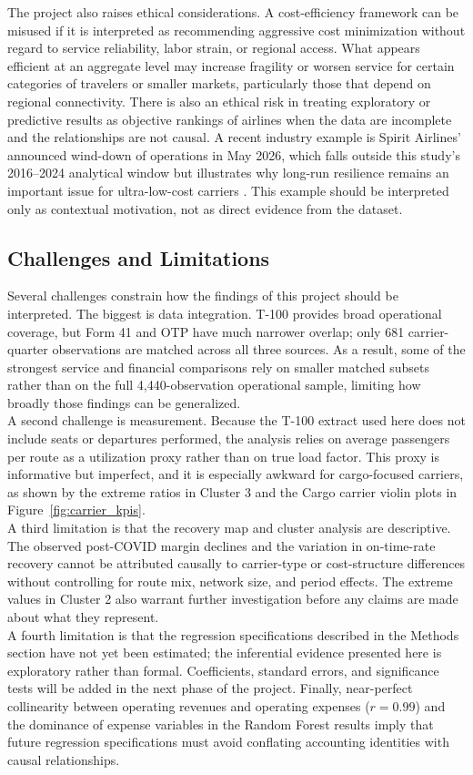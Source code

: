 \documentclass[11pt, letterpaper]{article}
\begin{document}
\indent The project also raises ethical considerations. A cost-efficiency framework can be misused if it is interpreted as recommending aggressive cost minimization without regard to service reliability, labor strain, or regional access. What appears efficient at an aggregate level may increase fragility or worsen service for certain categories of travelers or smaller markets, particularly those that depend on regional connectivity. There is also an ethical risk in treating exploratory or predictive results as objective rankings of airlines when the data are incomplete and the relationships are not causal. A recent industry example is Spirit Airlines' announced wind-down of operations in May 2026, which falls outside this study's 2016--2024 analytical window but illustrates why long-run resilience remains an important issue for ultra-low-cost carriers \cite{spirit_shutdown2026}. This example should be interpreted only as contextual motivation, not as direct evidence from the dataset.

\subsection{Challenges and Limitations}
Several challenges constrain how the findings of this project should be interpreted. The biggest is data integration. T-100 provides broad operational coverage, but Form 41 and OTP have much narrower overlap; only 681 carrier-quarter observations are matched across all three sources. As a result, some of the strongest service and financial comparisons rely on smaller matched subsets rather than on the full 4,440-observation operational sample, limiting how broadly those findings can be generalized.\\
\indent A second challenge is measurement. Because the T-100 extract used here does not include seats or departures performed, the analysis relies on average passengers per route as a utilization proxy rather than on true load factor. This proxy is informative but imperfect, and it is especially awkward for cargo-focused carriers, as shown by the extreme ratios in Cluster 3 and the Cargo carrier violin plots in Figure~\ref{fig:carrier_kpis}.\\
\indent A third limitation is that the recovery map and cluster analysis are descriptive. The observed post-COVID margin declines and the variation in on-time-rate recovery cannot be attributed causally to carrier-type or cost-structure differences without controlling for route mix, network size, and period effects. The extreme values in Cluster 2 also warrant further investigation before any claims are made about what they represent.\\
\indent A fourth limitation is that the regression specifications described in the Methods section have not yet been estimated; the inferential evidence presented here is exploratory rather than formal. Coefficients, standard errors, and significance tests will be added in the next phase of the project. Finally, near-perfect collinearity between operating revenues and operating expenses ($r = 0.99$) and the dominance of expense variables in the Random Forest results imply that future regression specifications must avoid conflating accounting identities with causal relationships.
\end{document}

